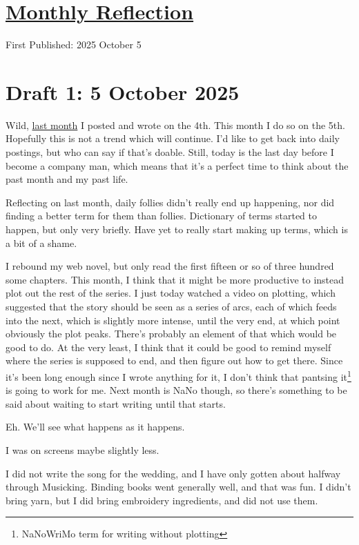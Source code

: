 \documentclass[12pt]{article}
\renewcommand{\,}{\textsuperscript{,}}
\begin{document}
  
\doublespacing  
\section{\href{reflection-september-25.html}{Monthly Reflection}}  
First Published: 2025 October 5

\section{Draft 1: 5 October 2025}

Wild, \href{reflection-august-25}{last month} I posted and wrote on the 4th.  
This month I do so on the 5th.  
Hopefully this is not a trend which will continue.  
I'd like to get back into daily postings, but who can say if that's doable.  
Still, today is the last day before I become a company man, which means that it's a perfect time to think about the past month and my past life.

Reflecting on last month, daily follies didn't really end up happening, nor did finding a better term for them than follies.  
Dictionary of terms started to happen, but only very briefly.  
Have yet to really start making up terms, which is a bit of a shame.

I rebound my web novel, but only read the first fifteen or so of three hundred some chapters.  
This month, I think that it might be more productive to instead plot out the rest of the series.  
I just today watched a video on plotting, which suggested that the story should be seen as a series of arcs, each of which feeds into the next, which is slightly more intense, until the very end, at which point obviously the plot peaks.  
There's probably an element of that which would be good to do.  
At the very least, I think that it could be good to remind myself where the series is supposed to end, and then figure out how to get there.  
Since it's been long enough since I wrote anything for it, I don't think that pantsing it\footnote{NaNoWriMo term for writing without plotting} is going to work for me.  
Next month is NaNo though, so there's something to be said about waiting to start writing until that starts.

Eh. We'll see what happens as it happens.

I was on screens maybe slightly less.

I did not write the song for the wedding, and I have only gotten about halfway through Musicking.  
Binding books went generally well, and that was fun.  
I didn't bring yarn, but I did bring embroidery ingredients, and did not use them.
\end{document}
